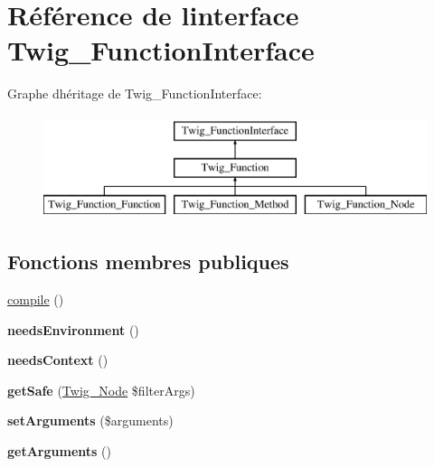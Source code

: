 \hypertarget{interface_twig___function_interface}{}\section{Référence de l\textquotesingle{}interface Twig\+\_\+\+Function\+Interface}
\label{interface_twig___function_interface}
Graphe d\textquotesingle{}héritage de Twig\+\_\+\+Function\+Interface\+:\begin{figure}[H]
\begin{center}
\leavevmode
\includegraphics[height=3.000000cm]{interface_twig___function_interface}
\end{center}
\end{figure}
\subsection*{Fonctions membres publiques}
\begin{DoxyCompactItemize}
\item 
\hyperlink{interface_twig___function_interface_a3815e7c2e73f00c2ebffcf5b90eef3b1}{compile} ()
\item 
{\bfseries needs\+Environment} ()\hypertarget{interface_twig___function_interface_a711311882c7dd1058f92f7eb0e8edeeb}{}\label{interface_twig___function_interface_a711311882c7dd1058f92f7eb0e8edeeb}

\item 
{\bfseries needs\+Context} ()\hypertarget{interface_twig___function_interface_a52c35bc6da8861f40aa59f1b99f7ef0f}{}\label{interface_twig___function_interface_a52c35bc6da8861f40aa59f1b99f7ef0f}

\item 
{\bfseries get\+Safe} (\hyperlink{class_twig___node}{Twig\+\_\+\+Node} \$filter\+Args)\hypertarget{interface_twig___function_interface_acc5701ec146ba15919020bbc42941632}{}\label{interface_twig___function_interface_acc5701ec146ba15919020bbc42941632}

\item 
{\bfseries set\+Arguments} (\$arguments)\hypertarget{interface_twig___function_interface_a2b7df0e0f61ee886144db2d59fc0d7da}{}\label{interface_twig___function_interface_a2b7df0e0f61ee886144db2d59fc0d7da}

\item 
{\bfseries get\+Arguments} ()\hypertarget{interface_twig___function_interface_a1d4c324c5a088be98d99d3efbf3502e1}{}\label{interface_twig___function_interface_a1d4c324c5a088be98d99d3efbf3502e1}

\end{DoxyCompactItemize}


